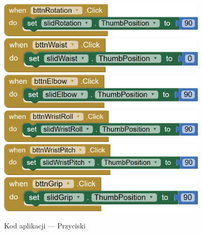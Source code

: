 \documentclass[11pt,titlepage]{article}
\begin{document}
\newpage

\begin{figure}[p]
    \begin{center}
        \includegraphics[width=0.9\textwidth]{img/app_src/posButtons/bttnRotation.png}
        \includegraphics[width=0.9\textwidth]{img/app_src/posButtons/bttnWaist.png}
        \includegraphics[width=0.9\textwidth]{img/app_src/posButtons/bttnElbow.png}
        \includegraphics[width=0.9\textwidth]{img/app_src/posButtons/bttnWristRoll.png}
        \includegraphics[width=0.9\textwidth]{img/app_src/posButtons/bttnWristPitch.png}
        \includegraphics[width=0.9\textwidth]{img/app_src/posButtons/bttnGrip.png}
    \end{center}
    \caption{Kod aplikacji — Przyciski}
    \label{AppPrzyciski}
\end{figure}

\newpage
\end{document}

